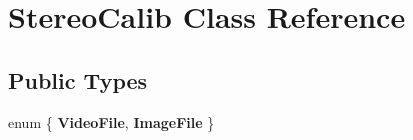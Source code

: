 \hypertarget{class_stereo_calib}{}\section{Stereo\+Calib Class Reference}
\label{class_stereo_calib}
\subsection*{Public Types}
\begin{DoxyCompactItemize}
\item 
enum \{ {\bfseries Video\+File}, 
{\bfseries Image\+File}
 \}\hypertarget{class_stereo_calib_abc54684cef2f45e2fc6858877d418b6c}{}\label{class_stereo_calib_abc54684cef2f45e2fc6858877d418b6c}

\end{DoxyCompactItemize}

